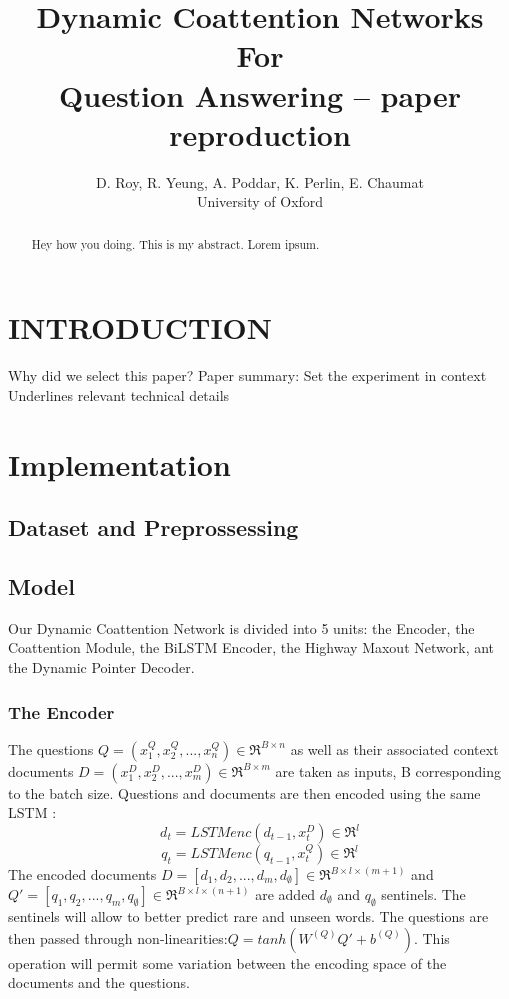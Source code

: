 \documentclass[letterpaper, 10 pt, conference]{ieeeconf}  %
\title{\LARGE \bf
Dynamic Coattention Networks For \\Question Answering -- paper reproduction
}
\author{D. Roy, R. Yeung, A. Poddar, K. Perlin, E. Chaumat
\\University of Oxford}%
\begin{document}
\maketitle
\thispagestyle{empty}
\pagestyle{empty}



\begin{abstract}

Hey how you doing. This is my abstract. Lorem ipsum.

\end{abstract}


\section{INTRODUCTION}

Why did we select this paper?
Paper summary: 
	Set the experiment in context
	Underlines relevant technical details



\section{Implementation}
\subsection{Dataset and Preprossessing}
\subsection{Model}
Our Dynamic Coattention Network is divided into 5 units: the Encoder, the Coattention Module, the BiLSTM Encoder, the Highway Maxout Network, ant the Dynamic Pointer Decoder.\\
\subsubsection{The Encoder}


The questions $Q=(x_1^Q,x_2^Q,...,x_n^Q)\in\Re^{B \times n}$  as well as their associated context documents $D=(x_1^D,x_2^D,...,x_m^D)\in\Re^{B\times m}$ are taken as inputs, B corresponding to the batch size.  
Questions and documents are then encoded using the same LSTM : 
\begin{equation}
d_t= LSTMenc(d_{t-1},x_t^D)\in\Re^{l} 
\end{equation}
\begin{equation}
q_t= LSTMenc(q_{t-1},x_t^Q)\in\Re^{l}
\end{equation}
The encoded documents $D=[d_1,d_2,...,d_m,d_{\emptyset}]\in\Re^{B \times l \times (m+1)}$ and  $Q'=[q_1,q_2,...,q_m,q_{\emptyset}]\in\Re^{B \times l \times (n+1)} $ are added $d_{\emptyset}$ and $q_{\emptyset}$ sentinels. The sentinels will allow to better predict rare and unseen words.
The questions are then passed through non-linearities:$Q=tanh(W^{(Q)}Q'+b^{(Q)})$. This operation will permit some variation between the encoding space of the documents and the questions.\\
 
\end{document}
